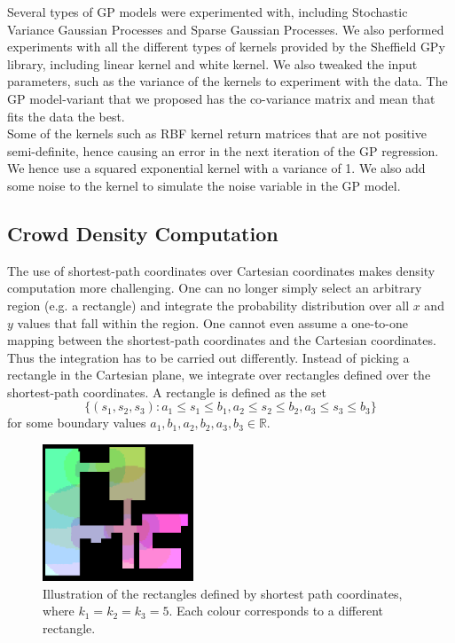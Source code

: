 \documentclass[letterpaper]{article}
\begin{document}
Several types of GP models were experimented with, including Stochastic Variance Gaussian Processes and Sparse Gaussian Processes. We also performed experiments with all the different types of kernels provided by the Sheffield GPy library, including linear kernel and white kernel. We also tweaked the input parameters, such as the variance of the kernels to experiment with the data. The GP model-variant that we proposed has the co-variance matrix and mean that fits the data the best. \\

Some of the kernels such as RBF kernel return matrices that are not positive semi-definite, hence causing an error in the next iteration of the GP regression. We hence use a squared exponential kernel with a variance of 1. We also add some noise to the kernel to simulate the noise variable in the GP model.

\subsection{Crowd Density Computation}

The use of shortest-path coordinates over Cartesian coordinates makes density computation more challenging. One can no longer simply select an arbitrary region (e.g. a rectangle) and integrate the probability distribution over all $x$ and $y$ values that fall within the region. One cannot even assume a one-to-one mapping between the shortest-path coordinates and the Cartesian coordinates. \\

Thus the integration has to be carried out differently. Instead of picking a rectangle in the Cartesian plane, we integrate over rectangles defined over the shortest-path coordinates. A rectangle is defined as the set 
\[\{(s_1,s_2,s_3) : a_1\leq s_1\leq b_1, a_2\leq s_2\leq b_2, a_3\leq s_3\leq b_3\}\]
for some boundary values $a_1,b_1,a_2,b_2,a_3,b_3 \in \mathbb{R}$.\\

\begin{figure}[!h]
  \centering
    \includegraphics[width=170px]{diagrams/sprectangles.png}
  \caption{Illustration of the rectangles defined by shortest path coordinates, where $k_1 = k_2 = k_3 = 5$. Each colour corresponds to a different rectangle.}
  \label{fig:sprectangles}
\end{figure}
\end{document}
